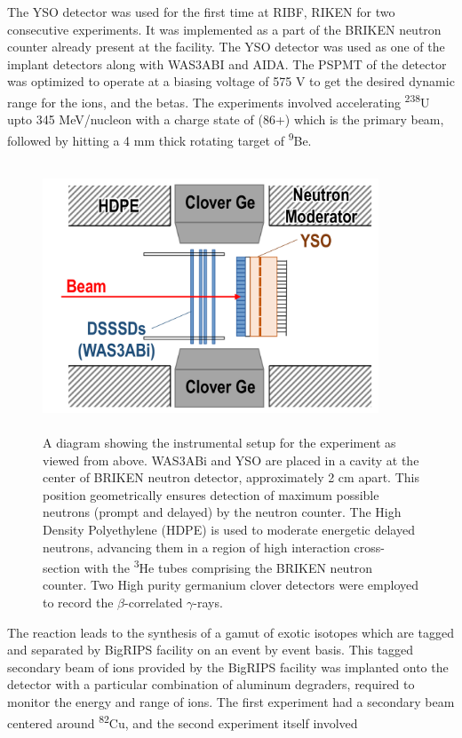 The YSO detector was used for the first time at RIBF, RIKEN for two consecutive experiments. It was implemented as a part of the BRIKEN \citep{BRIKEN} neutron counter already present at the facility. The YSO detector was used as one of the implant detectors along with WAS3ABI and AIDA. The PSPMT of the detector was optimized to operate at a biasing voltage of 575 V to get the desired dynamic range for the ions, and the betas. The experiments involved accelerating \textsuperscript{238}U upto 345 MeV/nucleon with a charge state of (86+) which is the primary beam, followed by hitting a 4 mm thick rotating target of \textsuperscript{9}Be.
\begin{figure}[h]
    \centering
    \includegraphics[width=10cm,height=8cm]{figures/experimental_setup.png}
    \caption[A diagram showing the instrumental setup for the]{A diagram showing the instrumental setup for the experiment as viewed from above. WAS3ABi and YSO are placed in a cavity at the center of BRIKEN neutron detector, approximately 2 cm apart. This position geometrically ensures detection of maximum possible neutrons (prompt and delayed) by the neutron counter. The High Density Polyethylene (HDPE) is used to moderate energetic delayed neutrons, advancing them in a region of high interaction cross-section with the \textsuperscript{3}He tubes comprising the BRIKEN neutron counter. Two High purity germanium clover detectors were employed to record the $\beta$-correlated $\gamma$-rays.}
    \label{fig:experimental}
\end{figure} 
The reaction leads to the synthesis of a gamut of exotic isotopes which are tagged and separated by BigRIPS facility on an event by event basis. This tagged  secondary beam of ions provided by the BigRIPS facility was implanted onto the detector with a particular combination of aluminum degraders, required to monitor the energy and range of ions. The first experiment had a secondary beam centered around \textsuperscript{82}Cu, and the second experiment itself involved

